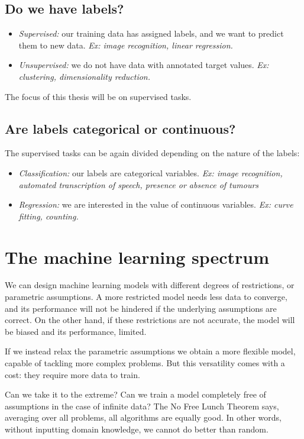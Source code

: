 \subsection{Do we have labels?}
\begin{itemize}
\item \emph{Supervised:} our training data has assigned labels, and we want to predict them to new data. \emph{Ex: image recognition, linear regression.}
\item \emph{Unsupervised:} we do not have data with annotated target values. \emph{Ex: clustering, dimensionality reduction.}
\end{itemize}

The focus of this thesis will be on supervised tasks.

\subsection{Are labels categorical or continuous?}
The supervised tasks can be again divided depending on the nature of the labels:
\begin{itemize}
\item \emph{Classification:} our labels are categorical variables. \emph{Ex: image recognition, automated transcription of speech, presence or absence of tumours}
\item \emph{Regression:} we are interested in the value of continuous variables. \emph{Ex: curve fitting, counting.}
\end{itemize}


\section{The machine learning spectrum}
We can design machine learning models with different degrees of restrictions, or parametric assumptions.
A more restricted model needs less data to converge, and its performance will not be hindered if the underlying assumptions are correct.
On the other hand, if these restrictions are not accurate, the model will be biased and its performance, limited.

If we instead relax the parametric assumptions we obtain a more flexible model, capable of tackling more complex problems.
But this versatility comes with a cost: they require more data to train.


Can we take it to the extreme?
Can we train a model completely free  of assumptions in the case of infinite data? The No Free Lunch Theorem \citep{no_free_lunch} says, averaging over all problems, all algorithms are equally good.
In other words, without inputting domain knowledge, we cannot do better than random.

